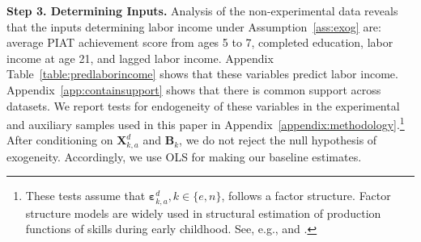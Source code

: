 \textbf{Step 3. Determining Inputs.} Analysis of the non-experimental data reveals that the inputs determining labor income under Assumption~\ref{ass:exog} are: average PIAT achievement score from ages 5 to 7, completed education, labor income at age 21, and lagged labor income. Appendix Table~\ref{table:predlaborincome} shows that these variables predict labor income. Appendix~\ref{app:containsupport} shows that there is common support across datasets. We report tests for endogeneity of these variables in the experimental and auxiliary samples used in this paper in Appendix~\ref{appendix:methodology}.\footnote{These tests assume that $\bm{\varepsilon}_{k,a}^d, k \in \{e,n\}$, follows a factor structure. Factor structure models are widely used in structural estimation of production functions of skills during early childhood. See, e.g., \citet{Cunha_Heckman_2008_JHR} and \citet{Cunha_Heckman_etal_2010_est_tech_cognoncog}.} After conditioning on $\bm{X}_{k,a}^d$ and $\bm{B}_{k}$, we do not reject the null hypothesis of exogeneity. Accordingly, we use OLS for making our baseline estimates.

